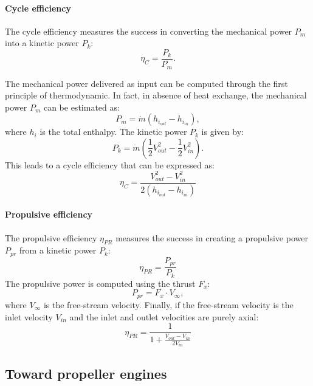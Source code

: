 \paragraph{Cycle efficiency}
The cycle efficiency measures the success in converting the mechanical
power $P_m$ into a kinetic power $P_k$:
\begin{equation}
	\eta_C = \frac{P_k}{P_m}.
\end{equation}

The mechanical power delivered as input
can be computed through the first principle of thermodynamic. In fact, in absence
of heat exchange, the mechanical power $P_m$ can be estimated as:
\begin{equation}
	P_m = \dot{m} (h_{i_{out}} - h_{i_{in}}),
\end{equation}
where $h_i$ is the total enthalpy.
The kinetic power $P_k$ is given by:
\begin{equation}
	P_k = \dot{m} \left(\frac{1}{2} V^2_{out} -
	\frac{1}{2} V^2_{in} \right).
\end{equation}
This leads to a cycle efficiency that can be expressed as:
\begin{equation}
	\eta_{C} = \frac{V^2_{out} - V^2_{in}}{2 (h_{i_{out}} - h_{i_{in}})}
\end{equation}

\paragraph{Propulsive efficiency}
The propulsive efficiency $\eta_{PR}$ measures the success
in creating a propulsive power $P_{pr}$ from a
kinetic power $P_k$:
\begin{equation}
	\eta_{PR} = \frac{P_{pr}}{P_k}
\end{equation}
The propulsive power is computed using the thrust $F_x$:
\begin{equation}
	P_{pr} = F_x \cdot V_{\infty},
\end{equation}
where $V_{\infty}$ is the free-stream velocity.
Finally, if the free-stream velocity is the inlet velocity $V_{in}$
and the inlet and outlet velocities are purely axial:
\begin{equation}
	\eta_{PR} = \frac{1}{1 + \frac{V_{out} - V_{in}}{2 V_{in}}}
	\label{eq:cror_propulsive_efficiency}
\end{equation}

\subsection{Toward propeller engines}
\label{sub:cror_toward_propeller}

